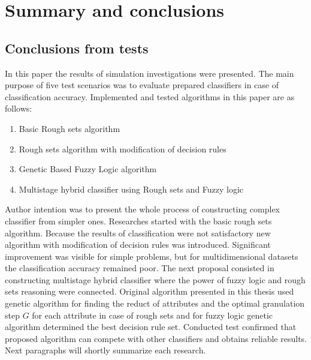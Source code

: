 \section{Summary and conclusions}
\label{cha:Summary}
\subsection{Conclusions from tests}
In this paper the results of simulation investigations were presented. The main
purpose of five test scenarios was to evaluate prepared classifiers in case of
classification accuracy. Implemented and tested algorithms in this paper are as follows:
\begin{enumerate}
    \item Basic Rough sets algorithm
    \item Rough sets algorithm with modification of decision rules
    \item Genetic Based Fuzzy Logic algorithm
    \item Multistage hybrid classifier using Rough sets and Fuzzy logic
\end{enumerate}
Author intention was to present the whole process of constructing complex
classifier from simpler ones. Researches started with the basic rough sets
algorithm. Because the results of classification were not satisfactory new
algorithm with modification of decision rules was introduced. Significant
improvement was visible for simple problems, but for multidimensional datasets
the classification accuracy remained poor. The next proposal consisted in
constructing multistage hybrid classifier where the power of fuzzy logic and
rough sets reasoning were connected. Original algorithm presented in this
thesis used genetic algorithm for finding the reduct of attributes and the
optimal granulation step $G$ for each attribute in case of rough sets and for
fuzzy logic genetic algorithm determined the best decision rule set. 
Conducted test confirmed that proposed algorithm can compete with other classifiers 
and obtains reliable results. Next paragraphs will shortly summarize each research. 

